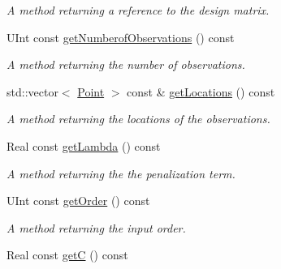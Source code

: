 \begin{DoxyCompactItemize}
\begin{DoxyCompactList}\small\item\em A method returning a reference to the design matrix. \item\end{DoxyCompactList}\item 
\hypertarget{classIOHandler_a3f4f820ee195e346d8c2dd8f202fb793}{
UInt const \hyperlink{classIOHandler_a3f4f820ee195e346d8c2dd8f202fb793}{getNumberofObservations} () const }
\label{classIOHandler_a3f4f820ee195e346d8c2dd8f202fb793}

\begin{DoxyCompactList}\small\item\em A method returning the number of observations. \item\end{DoxyCompactList}\item 
\hypertarget{classIOHandler_a9253260fd1c2d2a49a2ccb2e9bf307d3}{
std::vector$<$ \hyperlink{classPoint}{Point} $>$ const \& \hyperlink{classIOHandler_a9253260fd1c2d2a49a2ccb2e9bf307d3}{getLocations} () const }
\label{classIOHandler_a9253260fd1c2d2a49a2ccb2e9bf307d3}

\begin{DoxyCompactList}\small\item\em A method returning the locations of the observations. \item\end{DoxyCompactList}\item 
\hypertarget{classIOHandler_acfc1009b604200966d48031e21b71a4a}{
Real const \hyperlink{classIOHandler_acfc1009b604200966d48031e21b71a4a}{getLambda} () const }
\label{classIOHandler_acfc1009b604200966d48031e21b71a4a}

\begin{DoxyCompactList}\small\item\em A method returning the the penalization term. \item\end{DoxyCompactList}\item 
\hypertarget{classIOHandler_a5320d2bcb6513b607f4ef52325ab54ee}{
UInt const \hyperlink{classIOHandler_a5320d2bcb6513b607f4ef52325ab54ee}{getOrder} () const }
\label{classIOHandler_a5320d2bcb6513b607f4ef52325ab54ee}

\begin{DoxyCompactList}\small\item\em A method returning the input order. \item\end{DoxyCompactList}\item 
\hypertarget{classIOHandler_afacd04bc564b21e3baff7a5a73f3eb19}{
Real const \hyperlink{classIOHandler_afacd04bc564b21e3baff7a5a73f3eb19}{getC} () const }
\label{classIOHandler_afacd04bc564b21e3baff7a5a73f3eb19}


\end{DoxyCompactItemize}
